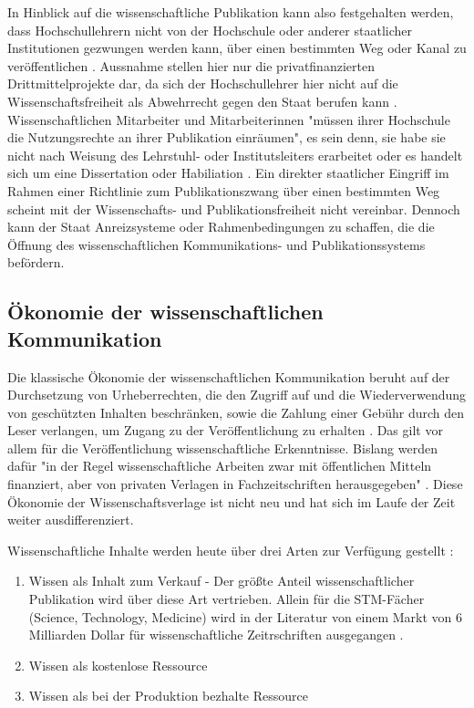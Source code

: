 In Hinblick auf die wissenschaftliche Publikation kann also festgehalten werden, dass Hochschullehrern nicht von der Hochschule oder anderer staatlicher Institutionen gezwungen werden kann, über einen bestimmten Weg oder Kanal zu veröffentlichen \cite{spindler_2006_rechtloa}. Aussnahme stellen hier nur die privatfinanzierten Drittmittelprojekte dar, da sich der Hochschullehrer hier nicht auf die Wissenschaftsfreiheit als Abwehrrecht gegen den Staat berufen kann \cite{spindler_2006_rechtloa}. Wissenschaftlichen Mitarbeiter und Mitarbeiterinnen "müssen ihrer Hochschule die Nutzungsrechte an ihrer Publikation einräumen", es sein denn, sie habe sie nicht nach Weisung des Lehrstuhl- oder Institutsleiters erarbeitet oder es handelt sich um eine Dissertation oder Habiliation \cite{spindler_2006_rechtloa}. Ein direkter staatlicher Eingriff im Rahmen einer Richtlinie zum Publikationszwang über einen bestimmten Weg scheint mit der Wissenschafts- und Publikationsfreiheit nicht vereinbar. Dennoch kann der Staat Anreizsysteme oder Rahmenbedingungen zu schaffen, die die Öffnung des wissenschaftlichen Kommunikations- und Publikationssystems befördern.

\subsection{Ökonomie der wissenschaftlichen Kommunikation}
Die klassische Ökonomie der wissenschaftlichen Kommunikation beruht auf der Durchsetzung von Urheberrechten, die den Zugriff auf und die Wiederverwendung von geschützten Inhalten beschränken, sowie die Zahlung einer Gebühr durch den Leser verlangen, um Zugang zu der Veröffentlichung zu erhalten \cite{CREATe_2014}. Das gilt vor allem für die Veröffentlichung wissenschaftliche Erkenntnisse. Bislang werden dafür "in der Regel wissenschaftliche Arbeiten zwar mit öffentlichen Mitteln finanziert, aber von privaten Verlagen in Fachzeitschriften herausgegeben" \cite{WD_bundestag_2009}. Diese Ökonomie der Wissenschaftsverlage ist nicht neu und hat sich im Laufe der Zeit weiter ausdifferenziert.

Wissenschaftliche Inhalte werden heute über drei Arten zur Verfügung gestellt \cite{cope2014future}:
\begin{enumerate}
\item Wissen als Inhalt zum Verkauf - Der größte Anteil wissenschaftlicher Publikation wird über diese Art vertrieben. Allein für die STM-Fächer (Science, Technology, Medicine) wird in der Literatur von einem Markt von 6 Milliarden Dollar für wissenschaftliche Zeitrschriften ausgegangen \cite{cope2014future}.
\item Wissen als kostenlose Ressource
\item Wissen als bei der Produktion bezhalte Ressource
\end{enumerate}

